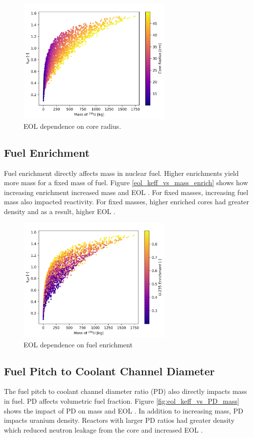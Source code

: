 \begin{figure}[h]
    \centering
    \includegraphics[width=3in]{../images/keff_vs_mass_235_core_r.png}
\caption{EOL \keff dependence on core radius.}
\label{fig:eol_keff_vs_r_core}
\end{figure}

\subsection{Fuel Enrichment}
Fuel enrichment directly affects \uran mass in nuclear fuel. Higher enrichments
yield more \uran mass for a fixed mass of fuel. Figure
\ref{eol_keff_vs_mass_enrich} shows how increasing enrichment increased \uran
mass and EOL \keff. For fixed \uran masses, increasing fuel mass also impacted
reactivity. For fixed \uran masses, higher enriched cores had greater \uran
density and as a result, higher EOL \keff.

\begin{figure}[h]
    \centering
    \includegraphics[width=3in]{../images/keff_vs_mass_235_enrich.png}
\caption{EOL \keff dependence on fuel enrichment}
\label{fig:eol_keff_vs_mass_enrich}
\end{figure}

\subsection{Fuel Pitch to Coolant Channel Diameter}
The fuel pitch to coolant channel diameter ratio (PD) also directly impacts
\uran mass in fuel. PD affects volumetric fuel fraction. Figure
\ref{fig:eol_keff_vs_PD_mass} shows the impact of PD on \uran mass and EOL
\keff. In addition to increasing \uran mass, PD impacts uranium density.
Reactors with larger PD ratios had greater \uran density which reduced neutron
leakage from the core and increased EOL \keff.

